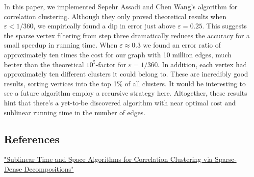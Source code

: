 \documentclass[
]{article}
\begin{document}
In this paper, we implemented Sepehr Assadi and Chen
Wang's algorithm for correlation clustering. Although they only proved theoretical results when $\varepsilon < 1/360$, we empirically found a dip in error just above $\varepsilon = 0.25$. This suggests the sparse vertex filtering from step three dramatically reduces the accuracy for a small speedup in running time. When $\varepsilon\approx 0.3$ we found an error ratio of approximately ten times the cost for our graph with 10 million edges, much better than the theoretical $10^5$-factor for $\varepsilon = 1/360$. In addition, each vertex had approximately ten different clusters it could belong to. These are incredibly good results, sorting vertices into the top 1\% of all clusters. It would be interesting to see a future algorithm employ a recursive strategy here. Altogether, these results hint that there's a yet-to-be discovered algorithm with near optimal cost and sublinear running time in the number of edges.

\hypertarget{references}{%
  \subsection{References}\label{references}}

\href{https://doi.org/10.48550/arxiv.2109.14528}{"Sublinear Time and
  Space Algorithms for Correlation Clustering via Sparse-Dense
  Decompositions"}
\end{document}
